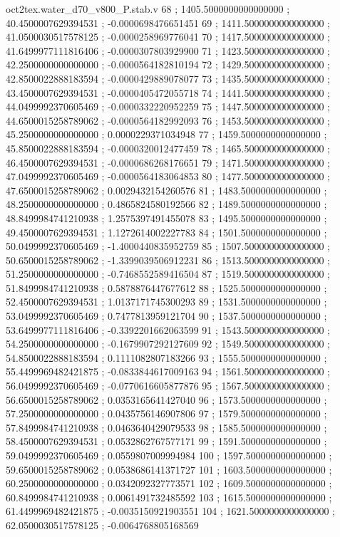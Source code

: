 \begin{filecontents}[overwrite]{oct2tex.water_d70_v800_P.stab.v}
68 ; 1405.5000000000000000 ; 40.4500007629394531 ; -0.0000698476651451
69 ; 1411.5000000000000000 ; 41.0500030517578125 ; -0.0000258969776041
70 ; 1417.5000000000000000 ; 41.6499977111816406 ; -0.0000307803929900
71 ; 1423.5000000000000000 ; 42.2500000000000000 ; -0.0000564182810194
72 ; 1429.5000000000000000 ; 42.8500022888183594 ; -0.0000429889078077
73 ; 1435.5000000000000000 ; 43.4500007629394531 ; -0.0000405472055718
74 ; 1441.5000000000000000 ; 44.0499992370605469 ; -0.0000332220952259
75 ; 1447.5000000000000000 ; 44.6500015258789062 ; -0.0000564182992093
76 ; 1453.5000000000000000 ; 45.2500000000000000 ; 0.0000229371034948
77 ; 1459.5000000000000000 ; 45.8500022888183594 ; -0.0000320012477459
78 ; 1465.5000000000000000 ; 46.4500007629394531 ; -0.0000686268176651
79 ; 1471.5000000000000000 ; 47.0499992370605469 ; -0.0000564183064853
80 ; 1477.5000000000000000 ; 47.6500015258789062 ; 0.0029432154260576
81 ; 1483.5000000000000000 ; 48.2500000000000000 ; 0.4865824580192566
82 ; 1489.5000000000000000 ; 48.8499984741210938 ; 1.2575397491455078
83 ; 1495.5000000000000000 ; 49.4500007629394531 ; 1.1272614002227783
84 ; 1501.5000000000000000 ; 50.0499992370605469 ; -1.4000440835952759
85 ; 1507.5000000000000000 ; 50.6500015258789062 ; -1.3399039506912231
86 ; 1513.5000000000000000 ; 51.2500000000000000 ; -0.7468552589416504
87 ; 1519.5000000000000000 ; 51.8499984741210938 ; 0.5878876447677612
88 ; 1525.5000000000000000 ; 52.4500007629394531 ; 1.0137171745300293
89 ; 1531.5000000000000000 ; 53.0499992370605469 ; 0.7477813959121704
90 ; 1537.5000000000000000 ; 53.6499977111816406 ; -0.3392201662063599
91 ; 1543.5000000000000000 ; 54.2500000000000000 ; -0.1679907292127609
92 ; 1549.5000000000000000 ; 54.8500022888183594 ; 0.1111082807183266
93 ; 1555.5000000000000000 ; 55.4499969482421875 ; -0.0833844617009163
94 ; 1561.5000000000000000 ; 56.0499992370605469 ; -0.0770616605877876
95 ; 1567.5000000000000000 ; 56.6500015258789062 ; 0.0353165641427040
96 ; 1573.5000000000000000 ; 57.2500000000000000 ; 0.0435756146907806
97 ; 1579.5000000000000000 ; 57.8499984741210938 ; 0.0463640429079533
98 ; 1585.5000000000000000 ; 58.4500007629394531 ; 0.0532862767577171
99 ; 1591.5000000000000000 ; 59.0499992370605469 ; 0.0559807009994984
100 ; 1597.5000000000000000 ; 59.6500015258789062 ; 0.0538686141371727
101 ; 1603.5000000000000000 ; 60.2500000000000000 ; 0.0342092327773571
102 ; 1609.5000000000000000 ; 60.8499984741210938 ; 0.0061491732485592
103 ; 1615.5000000000000000 ; 61.4499969482421875 ; -0.0035150921903551
104 ; 1621.5000000000000000 ; 62.0500030517578125 ; -0.0064768805168569

\end{filecontents}

